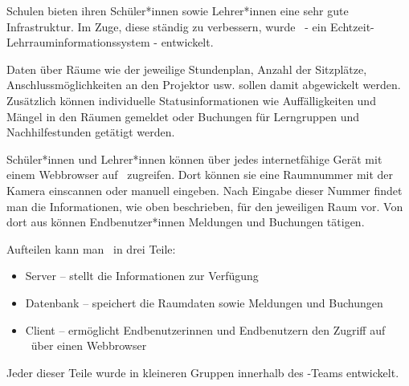 
Schulen bieten ihren Schüler*innen sowie Lehrer*innen eine sehr gute Infrastruktur. Im Zuge, diese ständig zu verbessern, wurde \ZELIA\ - ein Echtzeit-Lehr\-raum\-informations\-system - entwickelt. 

Daten über Räume wie der jeweilige Stundenplan, Anzahl der Sitzplätze, Anschlussmöglichkeiten an den Projektor usw. sollen damit abgewickelt werden. Zusätzlich können individuelle Statusinformationen wie Auffälligkeiten und Mängel in den Räumen gemeldet oder Buchungen für Lerngruppen und Nachhilfestunden getätigt werden.

Schüler*innen und Lehrer*innen können über jedes internetfähige Gerät mit einem Webbrowser auf \ZELIA\ zugreifen. Dort können sie eine Raumnummer mit der Kamera einscannen oder manuell eingeben. Nach Eingabe dieser Nummer findet man die Informationen, wie oben beschrieben, für den jeweiligen Raum vor. Von dort aus können Endbenutzer*innen Meldungen und Buchungen tätigen.

Aufteilen kann man \ZELIA\ in drei Teile:
\begin{itemize}
    \item Server -- stellt die Informationen zur Verfügung
    \item Datenbank -- speichert die Raumdaten sowie Meldungen und Buchungen
    \item Client -- ermöglicht Endbenutzerinnen und Endbenutzern den Zugriff auf \ZELIA\ über einen Webbrowser
\end{itemize}

Jeder dieser Teile wurde in kleineren Gruppen innerhalb des \ZELIA-Teams entwickelt.
